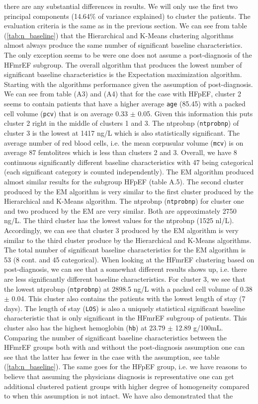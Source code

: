 \documentclass[../thesis.tex]{subfiles}
\begin{document}
\noindent there are any substantial differences in results. We will only use the first two principal components (14.64\% of variance explained) to cluster the patients. The evaluation criteria is the same as in the previous section. We can see from table (\ref{tab:n_baseline}) that the Hierarchical and K-Means clustering algorithms almost always produce the same number of significant baseline characteristics. The only exception seems to be were one does not assume a post-diagnosis of the HFmrEF subgroup. The overall algorithm that produces the lowest number of significant baseline characteristics is the Expectation maximization algorithm. Starting with the algorithms performance given the assumption of post-diagnosis. We can see from table (A3) and (A4) that for the case with HFpEF, cluster 2 seems to contain patients that have a higher average \texttt{age} (85.45) with a packed cell volume (\texttt{pcv}) that is on average 0.33 $\pm$ 0.05. Given this information this puts cluster 2 right in the middle of clusters 1 and 3. The ntprobnp (\texttt{ntprobnp}) of cluster 3 is the lowest at 1417 ng/L which is also statistically significant. The average number of red blood cells, i.e. the mean corpusular volume (\texttt{mcv}) is on average 87 femtolitres which is less than clusters 2 and 3. Overall, we have 8 continuous significantly different baseline characteristics with 47 being categorical (each significant category is counted independently). The EM algorithm produced almost similar results for the subgroup HFpEF (table A.5). The second cluster produced by the EM algorithm is very similar to the first cluster produced by the Hierarchical and K-Means algorithm. The ntprobnp (\texttt{ntprobnp}) for cluster one and two produced by the EM are very similar. Both are approximately 2750 ng/L. The third cluster has the lowest values for the ntprobnp (1525 nl/L). Accordingly, we can see that cluster 3 produced by the EM algorithm is very similar to the third cluster produce by the Hierarchical and K-Means algorithms. The total number of significant baseline characteristics for the EM algorithm is 53 (8 cont. and 45 categorical). When looking at the HFmrEF clustering based on post-diagnosis, we can see that a somewhat different results shows up, i.e. there are less significantly different baseline characteristics. For cluster 3, we see that the lowest ntprobnp (\texttt{ntprobnp}) at 2898.5 ng/L with a packed cell volume of 0.38 $\pm$ 0.04. This cluster also contains the patients with the lowest length of stay (7 days). The length of stay (\texttt{LOS}) is also a uniquely statistical significant baseline characteristic that is only significant in the HFmrEF subgroup of patients. This cluster also has the highest hemoglobin (\texttt{hb}) at 23.79 $\pm$ 12.89 g/100mL. Comparing the number of significant baseline characteristics between the HFmrEF groups both with and without the post-diagnosis assumption one can see that the latter has fewer in the case with the assumption, see table (\ref{tab:n_baseline}). The same goes for the HFpEF group, i.e. we have reasons to believe that assuming the physicians diagnosis is representative one can get additional clustered patient groups with higher degree of homogeneity compared to when this assumption is not intact. We have also demonstrated that the 
\end{document}
